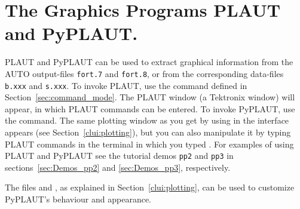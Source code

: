 \documentclass[12pt]{report}
\begin{document}
\chapter{ The Graphics Programs PLAUT and PyPLAUT.} \label{ch:PLAUT}
{\cal PLAUT} and {\cal PyPLAUT} can be used to extract graphical
information from the {\cal AUTO} output-files {\tt fort.7} and {\tt fort.8},
or from the corresponding data-files {\tt b.xxx} and {\tt s.xxx}.
To invoke {\cal PLAUT}, use the  command defined in 
Section~\ref{sec:command_mode}.
The {\cal PLAUT} window (a Tektronix window) will appear, in which {\cal PLAUT}
commands can be entered.
To invoke {\cal PyPLAUT}, use the  command. The same
plotting window as you get by using  in the \python interface
appears (see Section~\ref{clui:plotting}), 
but you can also manipulate it by typing {\cal PLAUT}
commands in the terminal in which you typed .
For examples of using {\cal PLAUT} and {\cal PyPLAUT} see the tutorial demos {\tt pp2}
and {\tt pp3} in sections~\ref{sec:Demos_pp2} and \ref{sec:Demos_pp3},
respectively.

The files  and , as explained in
Section~\ref{clui:plotting}, can be used to customize
{\cal PyPLAUT}'s behaviour and appearance.
\end{document}
